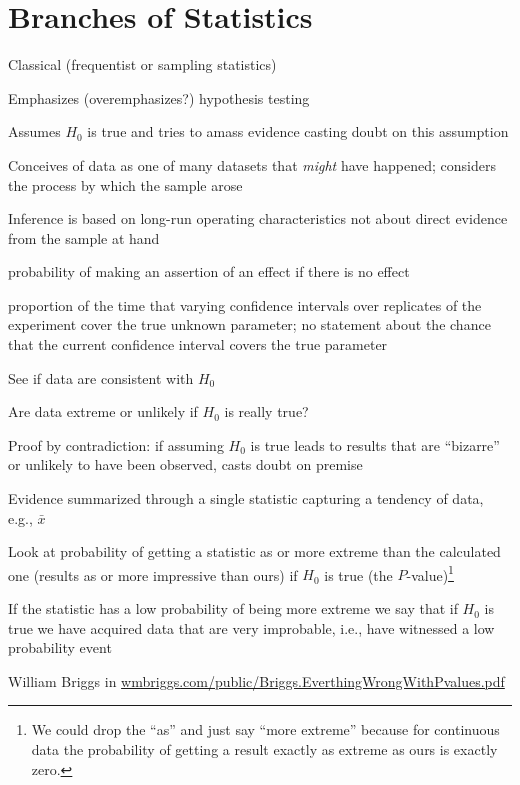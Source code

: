 \section{Branches of Statistics}\label{sec:htest-branches}
\bi
\item Classical (frequentist or sampling statistics)
 \bi
  \item Emphasizes (overemphasizes?) hypothesis testing
 \item Assumes $H_{0}$ is true and tries to amass evidence casting
   doubt on this assumption
 \item Conceives of data as one of many datasets that \emph{might} have
   happened; considers the process by which the sample arose
 \item Inference is based on long-run operating characteristics not
   about direct evidence from the sample at hand
   \bi
   \item probability of making an assertion of an effect if there is
     no effect
   \item proportion of the time that varying confidence intervals over replicates
     of the experiment cover the true unknown parameter; no statement
     about the chance that the 
     current confidence interval covers the true parameter
   \ei
 \item See if data are consistent with $H_{0}$
 \item Are data extreme or unlikely if $H_{0}$ is really true?
 \item Proof by contradiction: if assuming $H_{0}$ is true leads to
   results that are ``bizarre'' or unlikely to have been observed,
   casts doubt on premise
 \item Evidence summarized through a single statistic capturing a
   tendency of data, e.g., $\bar{x}$
 \item Look at probability of getting a statistic as or more extreme
   than the calculated one (results as or more impressive than ours)
   if $H_{0}$ is true (the $P$-value)\footnote{We could drop the
     ``as'' and just say ``more extreme'' because for continuous data
     the probability of getting a result exactly as extreme as ours is
     exactly zero.}
 \item If the statistic has a low probability of being more extreme we say
   that if $H_{0}$ is true we have acquired data that are very
   improbable, i.e., have witnessed a low probability event
 \item William Briggs in
   \href{https://wmbriggs.com/public/Briggs.EverthingWrongWithPvalues.pdf}{wmbriggs.com/public/Briggs.EverthingWrongWithPvalues.pdf}
